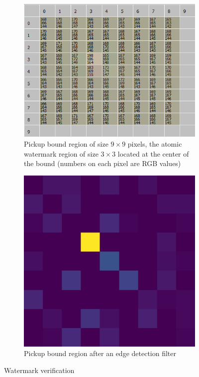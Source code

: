 \documentclass[a4paper,11pt,onecolumn]{memoir}
\begin{document}
\begin{figure}[ht]
    \centering
    \begin{subfigure}[t]{0.45\textwidth}
        \includegraphics[width=\textwidth]{coca_cola_bound.png}
        \caption{Pickup bound region of size $9\times9$ pixels, the atomic watermark region of size $3\times3$ located at the center of the bound (numbers on each pixel are RGB values)}
    \end{subfigure}
    \qquad
    \begin{subfigure}[t]{0.45\textwidth}
        \includegraphics[width=\textwidth]{coca_cola_laplace.png}
        \caption{Pickup bound region after an edge detection filter}
    \end{subfigure}
    \caption{Watermark verification}
    \label{fig:coca_cola_bound}
\end{figure}
\end{document}
